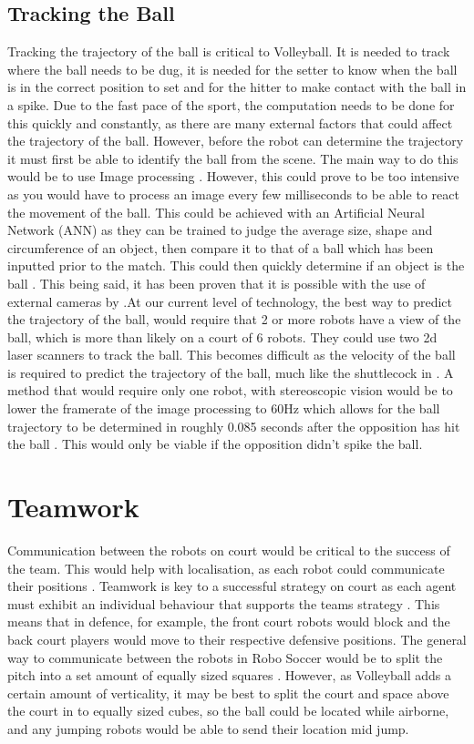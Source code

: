 \documentclass{scrartcl}
\begin{document}
 \subsection{Tracking the Ball}
Tracking the trajectory of the ball is critical to Volleyball. It is needed to track where the ball needs to be dug, it is needed for the setter to know when the ball is in the correct position to set and for the hitter to make contact with the ball in a spike. Due to the fast pace of the sport, the computation needs to be done for this quickly and constantly, as there are many external factors that could affect the trajectory of the ball. However, before the robot can determine the trajectory it must first be able to identify the ball from the scene. The main way to do this would be to use Image processing \cite{wong2008developing}. However, this could prove to be too intensive as you would have to process an image every few milliseconds to be able to react the movement of the ball. This could be achieved with an Artificial Neural Network (ANN) \cite{wong2008developing} as they can be trained to judge the average size, shape and circumference of an object, then compare it to that of a ball which has been inputted prior to the match. This could then quickly determine if an object is the ball \cite{wong2008developing}. This being said, it has been proven that it is possible with the use of external cameras by \cite{vere2016neural}.At our current level of technology, the best way to predict the trajectory of the ball, would require that 2 or more robots have a view of the ball, which is more than likely on a court of 6 robots. They could use two 2d laser scanners to track the ball. This becomes difficult as the velocity of the ball is required to predict the trajectory of the ball, much like the shuttlecock in \cite{waghmare2016badminton}. A method that would require only one robot, with stereoscopic vision would be to lower the framerate of the image processing to 60Hz which allows for the ball trajectory to be determined in roughly 0.085 seconds after the opposition has hit the ball \cite{nakai1998volleyball}. This would only be viable if the opposition didn't spike the ball.

\section{Teamwork}
Communication between the robots on court would be critical to the success of the team. This would help with localisation, as each robot could communicate their positions \cite{teimouri2016hybrid}. Teamwork is key to a successful strategy on court as each agent must exhibit an individual behaviour that supports the teams strategy \cite{larik2016using}. This means that in defence, for example, the front court robots would block and the back court players would move to their respective defensive positions. The general way to communicate between the robots in Robo Soccer would be to split the pitch into a set amount of equally sized squares \cite{ruiz2008team}. However, as Volleyball adds a certain amount of verticality, it may be best to split the court and space above the court in to equally sized cubes, so the ball could be located while airborne, and any jumping robots would be able to send their location mid jump.
\end{document}
